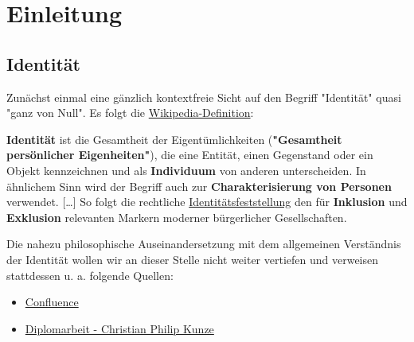 \section{Einleitung}
\label{sec:einleitung}

\subsection{Identität}
\label{sec:einleitung_identitaet}

Zunächst einmal eine gänzlich kontextfreie Sicht auf den Begriff "Identität" quasi "ganz von Null". Es folgt die \href{https://de.wikipedia.org/wiki/Identit%C3%A4t}{Wikipedia-Definition}:

\vspace{0.3cm}

\begin{Business-Def}[Identität]\label{defIdentity}

\textbf{Identität} ist die Gesamtheit der Eigentümlichkeiten (\textbf{"Gesamtheit persönlicher Eigenheiten"}), die eine Entität, einen Gegenstand oder ein Objekt kennzeichnen und als \textbf{Individuum} von anderen unterscheiden. In ähnlichem Sinn wird der Begriff auch zur \textbf{Charakterisierung von Personen} verwendet. […] So folgt die rechtliche \href{https://de.wikipedia.org/wiki/Identit%C3%A4tsfeststellung}{Identitätsfeststellung} den für \textbf{Inklusion} und \textbf{Exklusion} relevanten Markern moderner bürgerlicher Gesellschaften.

\end{Business-Def}

\vspace{0.3cm}

Die nahezu philosophische Auseinandersetzung mit dem allgemeinen Verständnis der Identität wollen wir an dieser Stelle nicht weiter vertiefen und verweisen stattdessen u. a. folgende Quellen:

\vspace{0.3cm}

\begin{Quelle}

\begin{itemize}
  \item \href{https://blockchainopedia.atlassian.net/wiki/spaces/RESEARCH/pages/81264861/Digitale+Identit+t+-+eine+allgemeine+Sicht}{Confluence}
  \item \href{https://vsis-www.informatik.uni-hamburg.de/getDoc.php/publications/191/InfTage_CPK.pdf}{Diplomarbeit - Christian Philip Kunze}
\end{itemize}

\end{Quelle}

